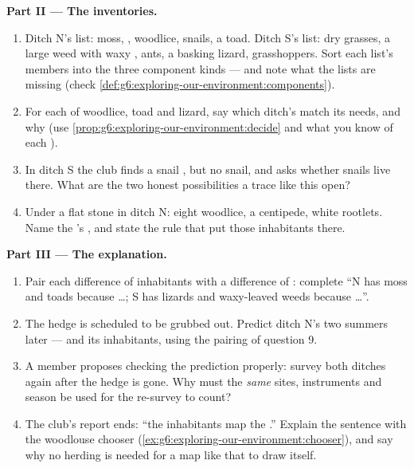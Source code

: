 \begin{problem}
\medskip\noindent\textbf{Part II --- The inventories.}
\begin{enumerate}[resume]
  \item Ditch N's list: moss, , woodlice, snails, a
        toad. Ditch S's list: dry grasses, a large weed with
        waxy , ants, a basking lizard, grasshoppers.
        Sort each list's members into the three component
        kinds --- and note what the lists are missing (check
        \cref{def:g6:exploring-our-environment:components}).
  \item For each of woodlice, toad and lizard, say which
        ditch's  match its needs, and why (use
        \cref{prop:g6:exploring-our-environment:decide} and
        what you know of each ).
  \item In ditch S the club finds a snail , but no
        snail, and asks whether snails live there. What are
        the two honest possibilities a trace like this
         open?
  \item Under a flat stone in ditch N: eight woodlice, a
        centipede, white rootlets. Name the 's
        , and state the rule that put those
        inhabitants there.
\end{enumerate}

\medskip\noindent\textbf{Part III --- The explanation.}
\begin{enumerate}[resume]
  \item Pair each difference of inhabitants with a
        difference of : complete ``N has moss and
        toads because \dots; S has lizards and waxy-leaved
        weeds because \dots''.
  \item The hedge is scheduled to be grubbed out. Predict
        ditch N's  two summers later --- and its
        inhabitants, using the pairing of question 9.
  \item A member proposes checking the prediction properly:
        survey both ditches again after the hedge is gone.
        Why must the \emph{same} sites, instruments and
        season be used for the re-survey to count?
  \item The club's report ends: ``the inhabitants map the
        .'' Explain the sentence with the
        woodlouse chooser
        (\cref{ex:g6:exploring-our-environment:chooser}),
        and say why no herding is needed for a map like
        that to draw itself.
\end{enumerate}
\end{problem}
